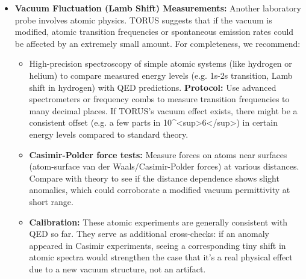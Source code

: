 \documentclass[
]{article}
\begin{document}
{\begin{itemize}
\begin{enumerate}
    constrained to below that level\hspace{0pt}. This means the theory's
    parameter for vacuum recursion effect must be very small or zero.
    If, however, a reproducible deviation is measured -- e.g. an extra
    force component or distance-dependent anomaly at the
    \$10\^{}\{-5\}\$ level or lower -- and cannot be explained by
    experimental error or standard physics, it would be strong evidence
    that the vacuum is ``structured'' by the TORUS recursion
    (essentially revealing a new tiny component in the vacuum
    energy)\hspace{0pt}. Even a slight discrepancy would be
    groundbreaking: it would indicate an incomplete understanding of
    vacuum physics and hint at TORUS's higher-dimensional influence
    emerging in precise QED tests.
  \end{enumerate}
\item
  \textbf{Vacuum Fluctuation (Lamb Shift) Measurements:} Another
  laboratory probe involves atomic physics. TORUS suggests that if the
  vacuum is modified, atomic transition frequencies or spontaneous
  emission rates could be affected by an extremely small
  amount\hspace{0pt}. For completeness, we recommend:

  \begin{itemize}
  \item
    High-precision spectroscopy of simple atomic systems (like hydrogen
    or helium) to compare measured energy levels (e.g. 1s-2s transition,
    Lamb shift in hydrogen) with QED predictions. \textbf{Protocol:} Use
    advanced spectrometers or frequency combs to measure transition
    frequencies to many decimal places. If TORUS's vacuum effect exists,
    there might be a consistent offset (e.g. a few parts in
    10\^{}\textless sup\textgreater6\textless/sup\textgreater) in
    certain energy levels compared to standard theory\hspace{0pt}.
  \item
    \textbf{Casimir-Polder force tests:} Measure forces on atoms near
    surfaces (atom-surface van der Waals/Casimir-Polder forces) at
    various distances. Compare with theory to see if the distance
    dependence shows slight anomalies, which could corroborate a
    modified vacuum permittivity at short range.
  \item
    \textbf{Calibration:} These atomic experiments are generally
    consistent with QED so far. They serve as additional cross-checks:
    if an anomaly appeared in Casimir experiments, seeing a
    corresponding tiny shift in atomic spectra would strengthen the case
    that it's a real physical effect due to a new vacuum structure, not
    an artifact.
  \end{itemize}
\end{itemize}

}
\end{document}
